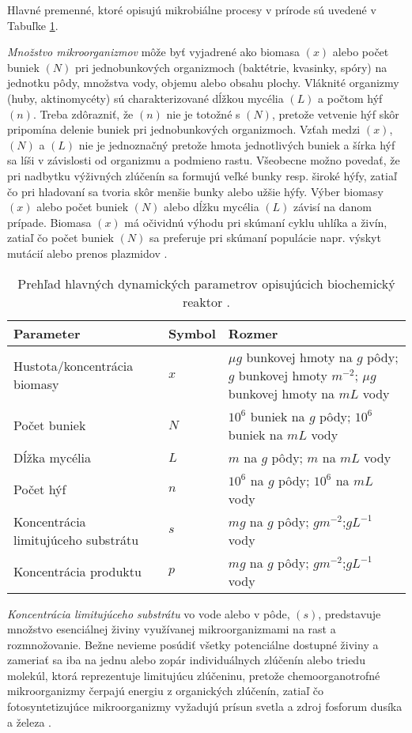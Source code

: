 Hlavné premenné, ktoré opisujú mikrobiálne procesy v prírode sú uvedené v Tabuľke \ref{tab: 1}.

\textit{Množstvo mikroorganizmov} môže byť vyjadrené ako biomasa $(x)$ alebo počet buniek $(N)$ pri jednobunkových organizmoch (baktétrie, kvasinky, spóry) na jednotku pôdy, množstva vody, objemu alebo obsahu plochy. Vláknité organizmy (huby, aktinomycéty) sú charakterizované dĺžkou mycélia $(L)$ a počtom hýf $(n)$. Treba zdôrazniť, že $(n)$ nie je totožné s $(N)$, pretože vetvenie hýf skôr pripomína delenie buniek pri jednobunkových organizmoch. Vzťah medzi $(x)$, $(N)$ a $(L)$ nie je jednoznačný pretože hmota jednotlivých buniek a šírka hýf sa líši v závislosti od organizmu a podmieno rastu. Všeobecne možno povedať, že pri nadbytku výživných zlúčenín sa formujú veľké bunky resp. široké hýfy, zatiaľ čo pri hladovaní sa tvoria skôr menšie bunky alebo užšie hýfy. Výber biomasy $(x)$ alebo počet buniek $(N)$ alebo dĺžku mycélia $(L)$ závisí na danom prípade. Biomasa $(x)$ má očividnú výhodu pri skúmaní cyklu uhlíka a živín, zatiaľ čo počet buniek $(N)$ sa preferuje pri skúmaní populácie napr. výskyt mutácií alebo prenos plazmidov \cite{ref2}.

\begin{table}[H]
	\caption{Prehľad hlavných dynamických parametrov opisujúcich biochemický reaktor \cite{ref2}.}
	\label{tab: 1}
	\begin{tabular}{p{5cm} p{1.9cm} p{4cm}}
		\hline
		\textbf{Parameter} & \textbf{Symbol} & \textbf{Rozmer} \\ 
		\hline
		Hustota/koncentrácia biomasy & $x$ & $\mu g$ bunkovej hmoty na $g$ pôdy; $g$ bunkovej hmoty $m^{-2}$; $\mu g$ bunkovej hmoty na $mL$ vody\\
		Počet buniek & $N$ & $10^{6}$ buniek na $g$ pôdy; $10^{6}$ buniek na $mL$ vody\\
		Dĺžka mycélia & $L$ & $m$ na $g$ pôdy; $m$ na $mL$ vody\\
		Počet hýf & $n$ & $10^{6}$ na $g$ pôdy; $10^{6}$ na $mL$ vody\\
		Koncentrácia limitujúceho substrátu & $s$ & $mg$ na $g$ pôdy; $gm^{-2}$;$gL^{-1}$ vody\\
		Koncentrácia produktu & $p$ & $mg$ na $g$ pôdy; $gm^{-2}$;$gL^{-1}$ vody\\
		\hline	
	\end{tabular}
\end{table}

\textit{Koncentrácia limitujúceho substrátu} vo vode alebo v pôde, $(s)$, predstavuje množstvo esenciálnej živiny využívanej mikroorganizmami na rast a rozmnožovanie. Bežne nevieme posúdiť všetky potenciálne dostupné živiny a zameriať sa iba na jednu alebo zopár individuálnych zlúčenín alebo triedu molekúl, ktorá reprezentuje limitujúcu zlúčeninu, pretože chemoorganotrofné mikroorganizmy čerpajú energiu z organických zlúčenín, zatiaľ čo fotosyntetizujúce mikroorganizmy vyžadujú prísun svetla a zdroj fosforum dusíka a železa \cite{ref2}.


